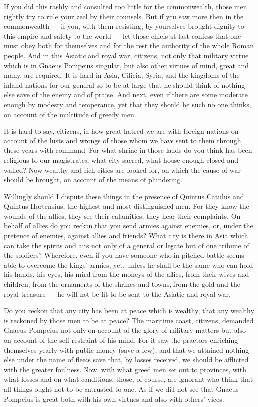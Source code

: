  If you did this rashly and consulted too little for the commonwealth, those men rightly try to rule your zeal by their counsels. But if you saw more then in the commonwealth --- if you, with them resisting, by yourselves brought dignity to this empire and safety to the world --- let those chiefs at last confess that one must obey both for themselves and for the rest the authority of the whole Roman people. And in this Asiatic and royal war, citizens, not only that military virtue which is in Gnaeus Pompeius singular, but also other virtues of mind, great and many, are required. It is hard in Asia, Cilicia, Syria, and the kingdoms of the inland nations for our general so to be at large that he should think of nothing else save of the enemy and of praise. And next, even if there are some moderate enough by modesty and temperance, yet that they should be such no one thinks, on account of the multitude of greedy men.

 It is hard to say, citizens, in how great hatred we are with foreign nations on account of the lusts and wrongs of those whom we have sent to them through these years with command. For what shrine in those lands do you think has been religious to our magistrates, what city sacred, what house enough closed and walled? Now wealthy and rich cities are looked for, on which the cause of war should be brought, on account of the means of plundering.

 Willingly should I dispute these things in the presence of Quintus Catulus and Quintus Hortensius, the highest and most distinguished men. For they know the wounds of the allies, they see their calamities, they hear their complaints. On behalf of allies do you reckon that you send armies against enemies, or, under the pretence of enemies, against allies and friends? What city is there in Asia which can take the spirits and airs not only of a general or legate but of one tribune of the soldiers? Wherefore, even if you have someone who in pitched battle seems able to overcome the kings' armies, yet, unless he shall be the same who can hold his hands, his eyes, his mind from the moneys of the allies, from their wives and children, from the ornaments of the shrines and towns, from the gold and the royal treasure --- he will not be fit to be sent to the Asiatic and royal war.

 Do you reckon that any city has been at peace which is wealthy, that any wealthy is reckoned by those men to be at peace? The maritime coast, citizens, demanded Gnaeus Pompeius not only on account of the glory of military matters but also on account of the self-restraint of his mind. For it saw the praetors enriching themselves yearly with public money (save a few), and that we attained nothing else under the name of fleets save that, by losses received, we should be afflicted with the greater foulness. Now, with what greed men set out to provinces, with what losses and on what conditions, those, of course, are ignorant who think that all things ought not to be entrusted to one. As if we did not see that Gnaeus Pompeius is great both with his own virtues and also with others' vices.

